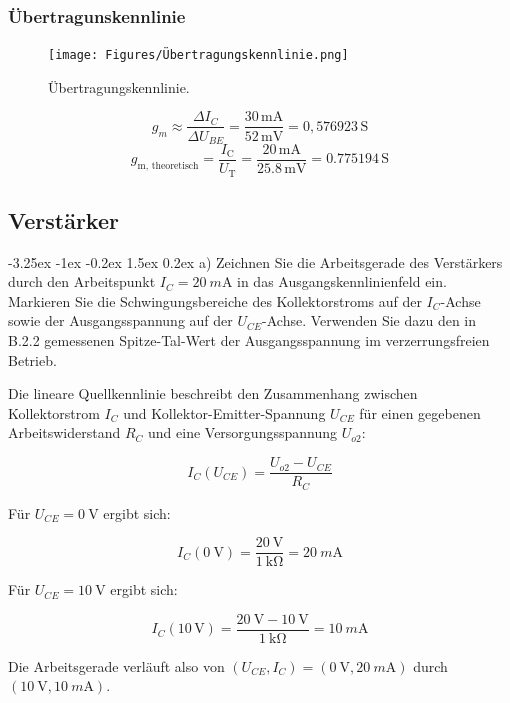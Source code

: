 \documentclass[
	a4paper, %
	12pt, %
]{CSUniSchoolLabReport}
\makeatletter
\renewcommand\paragraph{\@startsection{paragraph}{4}{\z@}%
  {-3.25ex \@plus -1ex \@minus -0.2ex}%
  {1.5ex \@plus 0.2ex}%
  {\normalfont\normalsize\bfseries}}
\newcommand{\milli}{m}
\makeatother
\begin{document}
\subsubsection{Übertragunskennlinie}
\begin{figure}[H]
	\centering
	\texttt{[image: Figures/Übertragungskennlinie.png]}
	\caption{Übertragungskennlinie.}
	\label{fig:Übertragungskennlinie}
\end{figure}
\[
g_m \approx \frac{\Delta I_C}{\Delta U_{BE}} = \frac{30\,\mathrm{mA}}{52\,\mathrm{mV}} = 0{,}576923\,\mathrm{S}
\]
\[
g_{\text{m, theoretisch}} = \frac{I_{\text{C}}}{U_{\text{T}}} = \frac{20\,\text{mA}}{25.8\,\text{mV}} = 0.775194\,\text{S}
\]
\subsection{Verstärker}


\paragraph{a) Zeichnen Sie die Arbeitsgerade des Verstärkers durch den Arbeitspunkt $I_C = \SI{20}{\milli\ampere}$ in das Ausgangskennlinienfeld ein. Markieren Sie die Schwingungsbereiche des Kollektorstroms auf der $I_C$-Achse sowie der Ausgangsspannung auf der $U_{CE}$-Achse. Verwenden Sie dazu den in B.2.2 gemessenen Spitze-Tal-Wert der Ausgangsspannung im verzerrungsfreien Betrieb.}

Die lineare Quellkennlinie beschreibt den Zusammenhang zwischen Kollektorstrom $I_C$ und Kollektor-Emitter-Spannung $U_{CE}$ für einen gegebenen Arbeitswiderstand $R_C$ und eine Versorgungsspannung $U_{o2}$:

\[
I_C(U_{CE}) = \frac{U_{o2} - U_{CE}}{R_C}
\]

Für $U_{CE} = \SI{0}{\volt}$ ergibt sich:

\[
I_C(\SI{0}{\volt}) = \frac{\SI{20}{\volt}}{\SI{1}{\kilo\ohm}} = \SI{20}{\milli\ampere}
\]

Für $U_{CE} = \SI{10}{\volt}$ ergibt sich:

\[
I_C(10\,\mathrm{V}) = \frac{\SI{20}{\volt}- \SI{10}{\volt}}{\SI{1}{\kilo\ohm}} = \SI{10}{\milli\ampere}
\]

Die Arbeitsgerade verläuft also von $(U_{CE}, I_C) = (\SI{0}{\volt}, \SI{20}{\milli\ampere})$ durch $(\SI{10}{\volt}, \SI{10}{\milli\ampere})$.
\end{document}
